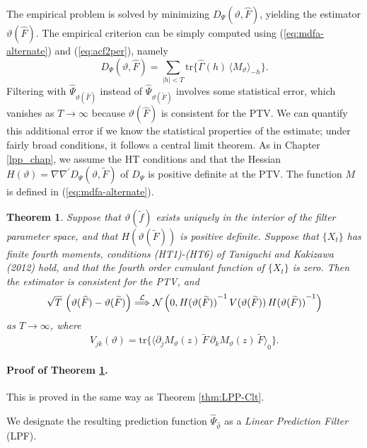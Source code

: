 \documentclass[a4paper]{book}
\def\convinlaw{\stackrel{{\cal L}}{\Longrightarrow }}
\def\tends{\rightarrow}
\newtheorem{Theorem}{Theorem}
\begin{document}
  The empirical problem is solved by minimizing $D_{\Psi} (\vartheta, \widehat{F})$,
 yielding the estimator $\vartheta (\widehat{F})$.  The empirical criterion can be simply 
 computed using (\ref{eq:mdfa-alternate}) and (\ref{eq:acf2per}), namely
\[
   D_{\Psi} (\vartheta, \widehat{F}) = \sum_{|h| < T } \mbox{tr} \{ 
   \widehat{\Gamma} (h) \,  { \langle  M_{\vartheta} \rangle }_{-h} \}.
\] 
Filtering with  $\widehat{\Psi}_{\vartheta (\widehat{F})}$ instead
 of $\widehat{\Psi}_{\vartheta (\widetilde{F})}$
 involves some statistical error, which vanishes as $T \tends \infty$ because
  $\vartheta (  \widehat{F})$ is consistent for the PTV.  We can quantify this additional 
 error if we know the statistical properties of the estimate; under fairly broad conditions,
 it follows a central limit theorem.  As in Chapter \ref{lpp_chap}, we assume 
  the HT conditions and that   the  Hessian  $H(\vartheta) = \nabla \nabla^{\prime}
  D_{\Psi} (\vartheta, \widetilde{F}) $  of $D_{\Psi} $ is positive definite at the PTV.
  The function $M$ is defined in (\ref{eq:mdfa-alternate}).

\begin{Theorem} 
\label{thm:MDFAasymp}
 Suppose that $\vartheta (\widetilde{f})$ exists uniquely in the
 interior of the filter parameter space, and that
 $H(\vartheta (\widetilde{F}))$ is 
 positive definite.  Suppose that $\{ X_t \}$ has finite fourth moments, 
conditions (HT1)-(HT6) of Taniguchi and Kakizawa (2012)
 hold, and that the fourth order cumulant function of $\{ X_t \}$ is zero.  
 Then the estimator is consistent for the PTV, and
\[
 \sqrt{T} \, \left( \vartheta( \widehat{F} ) - \vartheta (\widetilde{F}) \right) 
 \convinlaw \mathcal{N} \left( 0, { H(\vartheta (\widetilde{F})) }^{-1} \, 
 V (\vartheta (\widetilde{F})) \, { H(\vartheta (\widetilde{F})) }^{-1} \right)
\]
 as $T \tends \infty$, where 
\[
  V_{jk} (\vartheta) =  \mbox{tr} \{ { \langle  \partial_j M_{\vartheta} (z) \, \widetilde{F} \,
 \partial_k M_{\vartheta} (z) \, \widetilde{F} \rangle }_0 \}.
\]
\end{Theorem}

\paragraph{Proof of Theorem \ref{thm:MDFAasymp}.}
  This is proved in the same way as Theorem \ref{thm:LPP-Clt}.

\vspace{.5cm}

  We designate the resulting   prediction function
$\widehat{\Psi}_{\widehat{\vartheta}}$  as  a {\em Linear
Prediction Filter} (LPF). 
\end{document}
